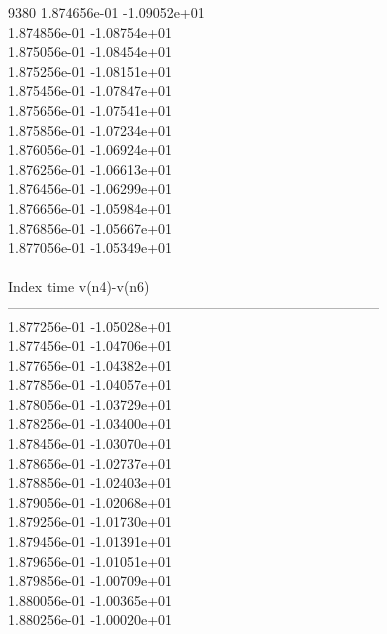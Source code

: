 9380	1.874656e-01	-1.09052e+01	\\ 	1.874856e-01	-1.08754e+01	\\ 	1.875056e-01	-1.08454e+01	\\ 	1.875256e-01	-1.08151e+01	\\ 	1.875456e-01	-1.07847e+01	\\ 	1.875656e-01	-1.07541e+01	\\ 	1.875856e-01	-1.07234e+01	\\ 	1.876056e-01	-1.06924e+01	\\ 	1.876256e-01	-1.06613e+01	\\ 	1.876456e-01	-1.06299e+01	\\ 	1.876656e-01	-1.05984e+01	\\ 	1.876856e-01	-1.05667e+01	\\ 	1.877056e-01	-1.05349e+01	\\ \hline
\\ \hline
Index   time            v(n4)-v(n6)     \\ \hline
--------------------------------------------------------------------------------\\ 	1.877256e-01	-1.05028e+01	\\ 	1.877456e-01	-1.04706e+01	\\ 	1.877656e-01	-1.04382e+01	\\ 	1.877856e-01	-1.04057e+01	\\ 	1.878056e-01	-1.03729e+01	\\ 	1.878256e-01	-1.03400e+01	\\ 	1.878456e-01	-1.03070e+01	\\ 	1.878656e-01	-1.02737e+01	\\ 	1.878856e-01	-1.02403e+01	\\ 	1.879056e-01	-1.02068e+01	\\ 	1.879256e-01	-1.01730e+01	\\ 	1.879456e-01	-1.01391e+01	\\ 	1.879656e-01	-1.01051e+01	\\ 	1.879856e-01	-1.00709e+01	\\ 	1.880056e-01	-1.00365e+01	\\ 	1.880256e-01	-1.00020e+01	\\ \hline
